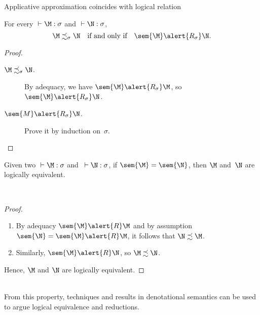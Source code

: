 \begin{frame}{Applicative approximation coincides with logical relation}
  \begin{lemma}
    For every ${}\vdash \M:\sigma$ and ${}\vdash \N : \sigma$,
    \[
      \M \precsim_\sigma \N
      \quad\text{if and only if}\quad
      \sem{\M} \alert{\mathrel{R_\sigma}} \N.
    \]
  \end{lemma}
  \begin{proof}
    \begin{description}
      \item[$\M \precsim_\sigma \N$.] By adequacy, we have
        $\sem{\M} \alert{\mathrel{R_\sigma}} \M$, so $\sem{\M}
        \alert{\mathrel{R_\sigma}} \N$. 
      \item[$\sem{M}\alert{\mathrel{R_\sigma}} \N$.]
        Prove it by induction on~$\sigma$.
    \end{description}
  \end{proof}
\end{frame}

\begin{frame}
  \begin{corollary}
    Given two ${}\vdash \M: \sigma$ and~${}\vdash \N : \sigma$,
    if $\sem{\M} = \sem{\N}$, then $\M$ and~$\N$ are logically equivalent. 
  \end{corollary}
  ~\\

  \begin{proof}
    \begin{enumerate}
      \item By adequacy $\sem{\M} \alert{\mathrel{R}} \M$ and by assumption
        $\sem{\N} = \sem{\M} \alert{\mathrel{R}} \M$, it follows that $\N
        \precsim \M$.  \item Similarly, 
        $\sem{\M} \alert{\mathrel{R}} \N$, so $\M \precsim \N$. 
    \end{enumerate}
    Hence, $\M$ and $\N$ are logically equivalent.
  \end{proof}
  ~\\
  From this property, techniques and results in denotational semantics can be
  used to argue logical equivalence and reductions. 
\end{frame}

